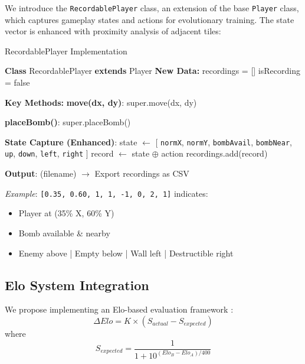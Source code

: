 \documentclass[sigconf]{acmart} %
\begin{document}
We introduce the \texttt{RecordablePlayer} class, an extension of the base \texttt{Player} class, which captures gameplay states and actions for evolutionary training. The state vector is enhanced with proximity analysis of adjacent tiles:

\begin{algorithm}[t]
	\caption{RecordablePlayer Implementation}
	\label{alg:recording}
	\DontPrintSemicolon
	
	\textbf{Class} RecordablePlayer \textbf{extends} Player\;
	\nl\textbf{New Data:} 
	recordings = [] 
	isRecording = false 
	
	\BlankLine
	\nl\textbf{Key Methods:}\;
	\nl \textbf{move(dx, dy)}:
	super.move(dx, dy)\;
	
	\nl \textbf{placeBomb()}:
	super.placeBomb()\;
	
	\nl\textbf{State Capture (Enhanced)}:
	state $\leftarrow$ [%
	\texttt{normX}, \texttt{normY}, 
	\texttt{bombAvail}, 
	\texttt{bombNear}, 
	\texttt{up}, \texttt{down}, \texttt{left}, \texttt{right} 
	]\;
	record $\leftarrow$ state $\oplus$ action 
	recordings.add(record)\;
	
	\nl\textbf{Output}:
	\Save(filename) $\rightarrow$ Export recordings as CSV\;
\end{algorithm}

\textit{Example}: \texttt{[0.35, 0.60, 1, 1, -1, 0, 2, 1]} indicates:
\begin{itemize}
	\item Player at (35\% X, 60\% Y)
	\item Bomb available \& nearby
	\item Enemy above | Empty below | Wall left | Destructible right
\end{itemize}

\subsection{Elo System Integration}
We propose implementing an Elo-based evaluation framework \cite{elo1978, coulom2017}:
\begin{equation}
	\Delta Elo = K \times (S_{actual} - S_{expected})
\end{equation}
where 
\begin{equation}
	S_{expected} = \frac{1}{1 + 10^{(Elo_B - Elo_A)/400}}
\end{equation}
\end{document}
